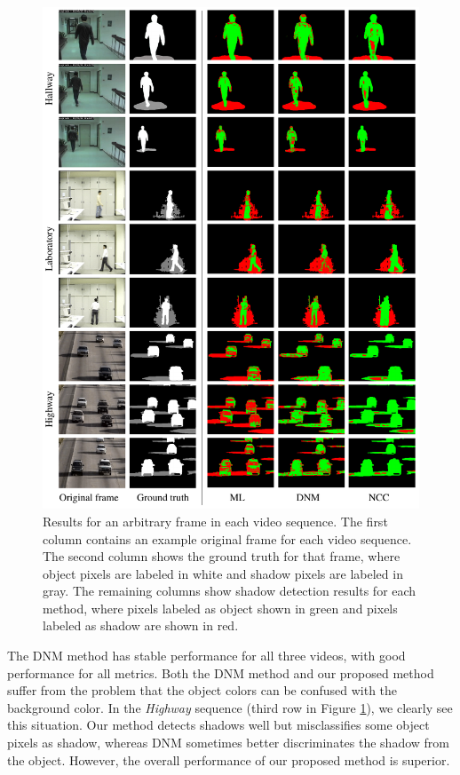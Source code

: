 \begin{figure}[t]
  \centering
  \includegraphics[width=6.2in]{figures/fig-shadow-results}
  \caption[Results for an arbitrary frame in each video
    sequence.]{\small Results for an arbitrary frame in each video
    sequence. The first column contains an example original frame for
    each video sequence. The second column shows the ground truth for
    that frame, where object pixels are labeled in white and shadow
    pixels are labeled in gray. The remaining columns show shadow
    detection results for each method, where pixels labeled as object
    shown in green and pixels labeled as shadow are shown in red.}
  \label{fig:results-for-arbitrary-frame}
\end{figure}

The DNM method has stable performance for all three videos, with good
performance for all metrics. Both the DNM method and our proposed
method suffer from the problem that the object colors can be confused
with the background color.  In the \textit{Highway} sequence (third
row in Figure \ref{fig:results-for-arbitrary-frame}), we clearly see
this situation. Our method detects shadows well but misclassifies some
object pixels as shadow, whereas DNM sometimes better discriminates
the shadow from the object.  However, the overall performance of our
proposed method is superior.

